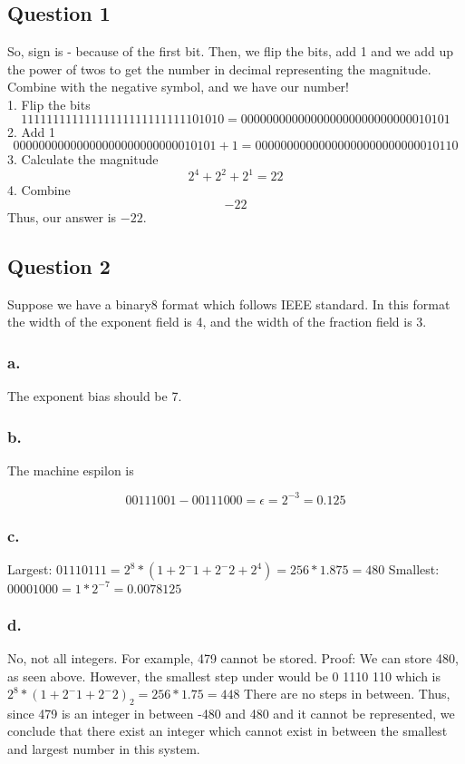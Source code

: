 \documentclass[12pt,a4paper]{article}
\begin{document}
\subsection*{Question 1}

So, sign is - because of the first bit. Then, we flip the bits, add 1 and we add up the power of twos to get the number in decimal representing the magnitude. Combine with the negative symbol, and we have our number!
\\ 
1. Flip the bits
$$11111111111111111111111111101010 = 000000000000000000000000000010101$$
2. Add 1
$$00000000000000000000000000010101 + 1 = 00000000000000000000000000010110 $$
3. Calculate the magnitude 
$$2^4 + 2^2 + 2^1 = 22$$
4. Combine
$$-22$$
\newline
Thus, our answer is $-22$.
\vfill
\newpage

\subsection*{Question 2}

Suppose we have a binary8 format which follows IEEE standard. In this format the width of the exponent field is 4, and the width of the fraction field is 3.

\subsubsection*{a.}
The exponent bias should be 7.
\subsubsection*{b.}
The machine espilon is 

$$0 0111 001 - 0 0111 000 = \epsilon = 2^{-3} = 0.125$$

\subsubsection*{c.}

Largest: $0 1110 111 = 2^8 * (1 + 2^-1 + 2^-2 + 2^4) = 256 * 1.875 = 480$
\newline
Smallest: $0 0001 000 = 1 * 2^{-7} = 0.0078125$
\subsubsection*{d.}

No, not all integers. For example, 479 cannot be stored.
Proof: We can store 480, as seen above. However, the smallest step under would be 0 1110 110
which is $2^8 * (1 + 2^-1 + 2^-2)_2 = 256 * 1.75 = 448$
\newline
There are no steps in between. Thus, since 479 is an integer in between -480 and 480 and it cannot be represented, we conclude that there exist an integer which cannot exist in between the smallest and largest number in this system.
\end{document}
